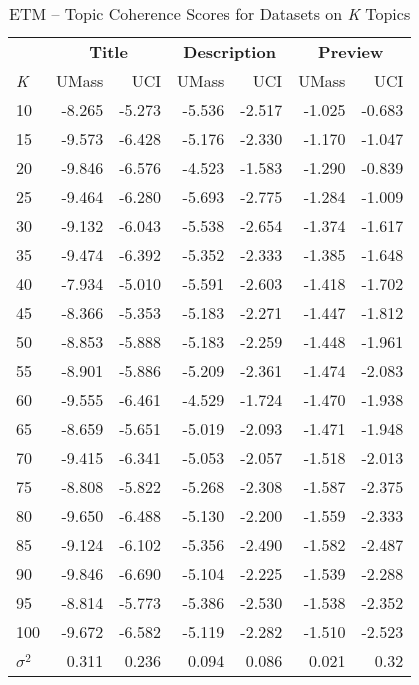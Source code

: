 \documentclass[letterpaper,12pt]{article}
\begin{document}
\begin{table}
	\caption{\label{tab:etm_data_comp} ETM -- Topic Coherence Scores for Datasets on \emph{K} Topics}
	\begin{center}
		\begin{tabular}{| l | rr | rr | rr |}
			\hline
			{} & \multicolumn{2}{c|}{\textbf{Title}} & \multicolumn{2}{c|}{\textbf{Description}} & \multicolumn{2}{c|}{\textbf{Preview}} \\
			\emph{K} &       UMass &    UCI &  UMass &    UCI &   UMass &    UCI \\
			\hline
			10  & -8.265 & -5.273 &      -5.536 & -2.517 &  -1.025 & -0.683 \\
			15  & -9.573 & -6.428 &      -5.176 & -2.330 &  -1.170 & -1.047 \\
			20  & -9.846 & -6.576 &      -4.523 & -1.583 &  -1.290 & -0.839 \\
			25  & -9.464 & -6.280 &      -5.693 & -2.775 &  -1.284 & -1.009 \\
			30  & -9.132 & -6.043 &      -5.538 & -2.654 &  -1.374 & -1.617 \\
			35  & -9.474 & -6.392 &      -5.352 & -2.333 &  -1.385 & -1.648 \\
			40  & -7.934 & -5.010 &      -5.591 & -2.603 &  -1.418 & -1.702 \\
			45  & -8.366 & -5.353 &      -5.183 & -2.271 &  -1.447 & -1.812 \\
			50  & -8.853 & -5.888 &      -5.183 & -2.259 &  -1.448 & -1.961 \\
			55  & -8.901 & -5.886 &      -5.209 & -2.361 &  -1.474 & -2.083 \\
			60  & -9.555 & -6.461 &      -4.529 & -1.724 &  -1.470 & -1.938 \\
			65  & -8.659 & -5.651 &      -5.019 & -2.093 &  -1.471 & -1.948 \\
			70  & -9.415 & -6.341 &      -5.053 & -2.057 &  -1.518 & -2.013 \\
			75  & -8.808 & -5.822 &      -5.268 & -2.308 &  -1.587 & -2.375 \\
			80  & -9.650 & -6.488 &      -5.130 & -2.200 &  -1.559 & -2.333 \\
			85  & -9.124 & -6.102 &      -5.356 & -2.490 &  -1.582 & -2.487 \\
			90  & -9.846 & -6.690 &      -5.104 & -2.225 &  -1.539 & -2.288 \\
			95  & -8.814 & -5.773 &      -5.386 & -2.530 &  -1.538 & -2.352 \\
			100 & -9.672 & -6.582 &      -5.119 & -2.282 &  -1.510 & -2.523 \\
			\hline
			$\sigma^2$ & 0.311 & 0.236 & 0.094 & 0.086 & 0.021 & 0.32 \\
			\hline
			\end{tabular}
	\end{center}
\end{table}
\end{document}

